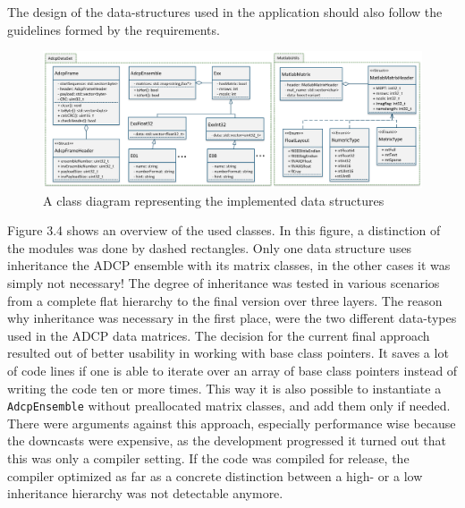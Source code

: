 The design of the data-structures used in the application should also follow the guidelines formed by the requirements. 
\begin{figure}[h]
\centering
      \includegraphics[width=1\textwidth]{data_structures}
        \caption{A class diagram representing the implemented data structures}
\end{figure}
Figure 3.4 shows an overview of the used classes. In this figure, a distinction of the modules was done by dashed rectangles. Only one data structure uses inheritance the ADCP ensemble with its matrix classes, in the other cases it was simply not necessary! The degree of inheritance was tested in various scenarios from a complete flat hierarchy to the final version over three layers. The reason why inheritance was necessary in the first place, were the two different data-types used in the ADCP data matrices. The decision for the current final approach resulted out of better usability in working with base class pointers. It saves a lot of code lines if one is able to iterate over an array of base class pointers instead of writing the code ten or more times. This way it is also possible to instantiate a \texttt{AdcpEnsemble} without preallocated matrix classes, and add them only if needed. There were arguments against this approach, especially performance wise because the downcasts were expensive, as the development progressed it turned out that this was only a compiler setting. If the code was compiled for release, the compiler optimized as far as a concrete distinction between a high- or a low inheritance hierarchy was not detectable anymore.

